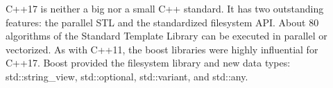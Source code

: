 

C++17 is neither a big nor a small C++ standard. It has two outstanding features: the parallel STL and the standardized filesystem API. About 80 algorithms of the Standard Template Library can be executed in parallel or vectorized. As with C++11, the boost libraries were highly influential for C++17. Boost provided the filesystem library and new data types: std::string\_view, std::optional, std::variant, and std::any.